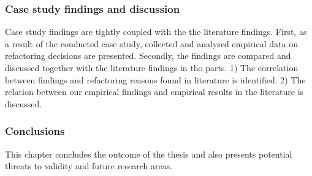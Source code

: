 \subsubsection*{Case study findings and discussion}
Case study findings are tightly coupled with the the literature findings. First, as a result of the conducted case study, collected and analysed empirical data on refactoring decisions are presented. Secondly, the findings are compared and discussed together with the literature findings in tho parts. 1) The correlation between findings and refactoring reasons found in literature is identified. 2) The relation between our empirical findings and empirical results in the literature is discussed. 


\subsubsection*{Conclusions}
This chapter concludes the outcome of the thesis and also presents potential threats to validity and future research areas. 

\clearpage